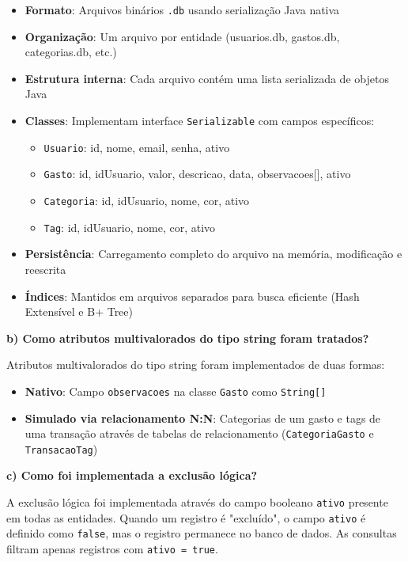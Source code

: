 \documentclass[12pt,a4paper]{article}
\begin{document}
\begin{itemize}
  \item \textbf{Formato}: Arquivos binários \texttt{.db} usando serialização Java nativa
  \item \textbf{Organização}: Um arquivo por entidade (usuarios.db, gastos.db, categorias.db, etc.)
  \item \textbf{Estrutura interna}: Cada arquivo contém uma lista serializada de objetos Java
  \item \textbf{Classes}: Implementam interface \texttt{Serializable} com campos específicos:
    \begin{itemize}
      \item \texttt{Usuario}: id, nome, email, senha, ativo
      \item \texttt{Gasto}: id, idUsuario, valor, descricao, data, observacoes[], ativo
      \item \texttt{Categoria}: id, idUsuario, nome, cor, ativo
      \item \texttt{Tag}: id, idUsuario, nome, cor, ativo
    \end{itemize}
  \item \textbf{Persistência}: Carregamento completo do arquivo na memória, modificação e reescrita
  \item \textbf{Índices}: Mantidos em arquivos separados para busca eficiente (Hash Extensível e B+ Tree)
\end{itemize}

\textbf{b) Como atributos multivalorados do tipo string foram tratados?}

Atributos multivalorados do tipo string foram implementados de duas formas:
\begin{itemize}
  \item \textbf{Nativo}: Campo \texttt{observacoes} na classe \texttt{Gasto} como \texttt{String[]}
  \item \textbf{Simulado via relacionamento N:N}: Categorias de um gasto e tags de uma transação através de tabelas de relacionamento (\texttt{CategoriaGasto} e \texttt{TransacaoTag})
\end{itemize}

\textbf{c) Como foi implementada a exclusão lógica?}

A exclusão lógica foi implementada através do campo booleano \texttt{ativo} presente em todas as entidades. Quando um registro é "excluído", o campo \texttt{ativo} é definido como \texttt{false}, mas o registro permanece no banco de dados. As consultas filtram apenas registros com \texttt{ativo = true}.
\end{document}

